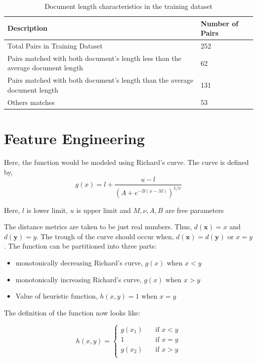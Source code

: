 \documentclass[11pt]{article}
\begin{document}
	\begin{table}[h]
		\begin{tabu} to 0.5\textwidth { | X[l] | X[c] | }
			\hline \bf Description & \bf Number of Pairs \\
			\hline 
			Total Pairs in Training Dataset & 252 \\ \hline
			Pairs matched with both document's length less than the average document length  & 62\\ \hline
			Pairs matched with both document's length than the average document length  & 131\\ \hline
			Others matches & 53\\ \hline
		\end{tabu}
		\caption{\label{table} Document length characteristics in the training dataset }
	\end{table}
	
	\section{Feature Engineering}
	Here, the function would be modeled using Richard's curve. The curve is defined by,
	\begin{equation}
		g(x) = l + \frac{u - l}{(A + e^{{-B(x-M)}})^{{1/\nu }}}
	\end{equation}
	
	Here, $l$ is lower limit, $u$ is upper limit and $M, \nu, A, B$ are free parameters
	
	The distance metrics are taken to be just real numbers. Thus, $d(\mathbf{x}) = x$ and $d(\mathbf{y}) = y$. The trough of the curve should occur when, $d(\mathbf{x}) = d(\mathbf{y})$ or $x = y$. The function can be partitioned into three parts:
	\begin{itemize}
		\item monotonically decreasing Richard's curve, $g(x)$  when $x < y$
		\item monotonically increasing Richard's curve, $g(x)$ when $x > y$
		\item Value of heuristic function, $h(x, y) = 1$  when $x = y$
	\end{itemize}
	
	The definition of the function now looks like:
	
	\begin{equation}
		h(x, y) = 
		\begin{cases}
			g(x_1)       & \quad \text{if } x < y\\
			1 & \quad \text{if } x = y\\
			g(x_2)  & \quad \text{if } x > y\\
		\end{cases}
	\end{equation}
	
\end{document}
